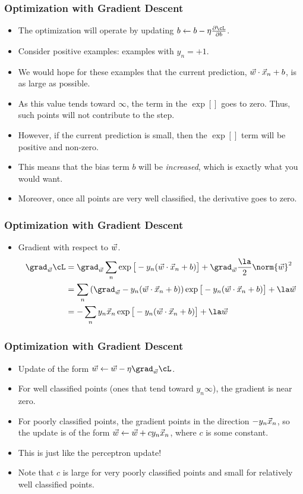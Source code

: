 \documentclass[trans,aspectratio=169]{beamer}
\begin{document}
\begin{frame}
  \frametitle{Optimization with Gradient Descent}
\begin{itemize}
\item
The optimization will operate by updating $b
\leftarrow b - \eta \partialof{\cL}{b}$.  
\item Consider positive examples:
examples with $y_n=+1$. 
\item  We would hope for these examples that the
current prediction, ${\vec w} \cdot {\vec x}_n+b$, is as large as possible.
\item 
As this value tends toward $\infty$, the term in the $\exp[]$ goes to
zero.  Thus, such points will not contribute to the step.  
\item However, if
the current prediction is small, then the $\exp[]$ term will be
positive and non-zero.  
\item This means that the bias term $b$ will be
\emph{increased}, which is exactly what you would want.
\item  Moreover,
once all points are very well classified, the derivative goes to zero.
\end{itemize}
\end{frame}

\begin{frame}
  \frametitle{Optimization with Gradient Descent}
\begin{itemize}
\item
Gradient with
respect to ${\vec w}$.
%
\begin{align}
\grad_\vw \cL
&= \grad_\vw \sum_n \exp\big[-y_n (\dotp{\vec w}{\vx_n}+b)\big] 
 + \grad_\vw\frac \la 2 \norm{\vw}^2 \\
&= \sum_n \left( \grad_\vw -y_n (\dotp{\vec w}{\vx_n}+b) \right) \exp\big[-y_n (\dotp{\vec w}{\vx_n}+b)\big] 
 + \la \vw \\
&= -\sum_n y_n \vx_n \exp\big[-y_n (\dotp{\vec w}{\vx_n}+b)\big] 
 + \la \vw
\end{align}
%
\end{itemize}
\end{frame}

\begin{frame}
  \frametitle{Optimization with Gradient Descent}
\begin{itemize}
\item
Update of the form
$\vw \leftarrow \vw - \eta \grad_\vw \cL$.  
\item For well classified points
(ones that tend toward $y_n \infty$), the gradient is near zero.
\item For poorly classified points, the gradient points in the direction
$-y_n{\vec x}_n$, so the update is of the form ${\vec w} \leftarrow {\vec w} + c
y_n{\vec x}_n$, where $c$ is some constant.  
\item This is just like the
perceptron update! 
\item  Note that $c$ is large for very poorly classified
points and small for relatively well classified points.
\end{itemize}
\end{frame}
\end{document}
